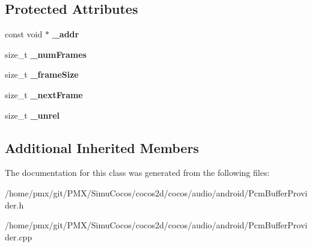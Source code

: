 \subsection*{Protected Attributes}
\begin{DoxyCompactItemize}
\item 
\mbox{\label{classcocos2d_1_1experimental_1_1PcmBufferProvider_a3704c8d23320964ca2ff2980ca972ce4}} 
const void $\ast$ {\bfseries \+\_\+addr}
\item 
\mbox{\label{classcocos2d_1_1experimental_1_1PcmBufferProvider_aa833da16afa8273973ff148524590660}} 
size\+\_\+t {\bfseries \+\_\+num\+Frames}
\item 
\mbox{\label{classcocos2d_1_1experimental_1_1PcmBufferProvider_afccd50085f8ee2b24eeedb9afca5f286}} 
size\+\_\+t {\bfseries \+\_\+frame\+Size}
\item 
\mbox{\label{classcocos2d_1_1experimental_1_1PcmBufferProvider_a30737b01ed22d4b41b5bb92303aff3bd}} 
size\+\_\+t {\bfseries \+\_\+next\+Frame}
\item 
\mbox{\label{classcocos2d_1_1experimental_1_1PcmBufferProvider_ac93f3a4f8478afb47d0bf88668d01b9f}} 
size\+\_\+t {\bfseries \+\_\+unrel}
\end{DoxyCompactItemize}
\subsection*{Additional Inherited Members}


The documentation for this class was generated from the following files\+:\begin{DoxyCompactItemize}
\item 
/home/pmx/git/\+P\+M\+X/\+Simu\+Cocos/cocos2d/cocos/audio/android/Pcm\+Buffer\+Provider.\+h\item 
/home/pmx/git/\+P\+M\+X/\+Simu\+Cocos/cocos2d/cocos/audio/android/Pcm\+Buffer\+Provider.\+cpp\end{DoxyCompactItemize}
